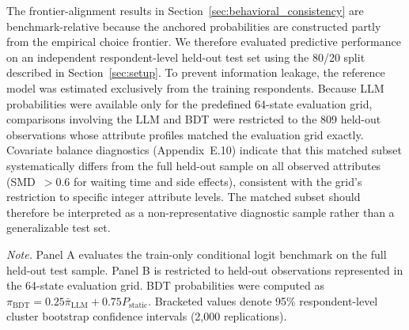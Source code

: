 \documentclass[11pt]{article}
\begin{document}
The frontier-alignment results in Section~\ref{sec:behavioral_consistency} are benchmark-relative because the anchored probabilities are constructed partly from the empirical choice frontier. We therefore evaluated predictive performance on an independent respondent-level held-out test set using the 80/20 split described in Section~\ref{sec:setup}. To prevent information leakage, the reference model was estimated exclusively from the training respondents. Because LLM probabilities were available only for the predefined 64-state evaluation grid, comparisons involving the LLM and BDT were restricted to the 809 held-out observations whose attribute profiles matched the evaluation grid exactly. Covariate balance diagnostics (Appendix~E.10) indicate that this matched subset systematically differs from the full held-out sample on all observed attributes (SMD~$>0.6$ for waiting time and side effects), consistent with the grid's restriction to specific integer attribute levels. The matched subset should therefore be interpreted as a non-representative diagnostic sample rather than a generalizable test set.

\begin{table}[!t]
\centering
\caption{Held-out predictive performance on DCE choice data.}
\label{tab:heldout}
\small
{}
\vspace{0.4em}

\begin{minipage}{\textwidth}
\small
\textit{Note.} Panel A evaluates the train-only conditional logit benchmark on the full held-out test sample. Panel B is restricted to held-out observations represented in the 64-state evaluation grid. BDT probabilities were computed as $\pi_{\mathrm{BDT}}=0.25\bar{\pi}_{\mathrm{LLM}}+0.75P_{\mathrm{static}}$. Bracketed values denote 95\% respondent-level cluster bootstrap confidence intervals (2,000 replications).
\end{minipage}
\end{table}
\end{document}
